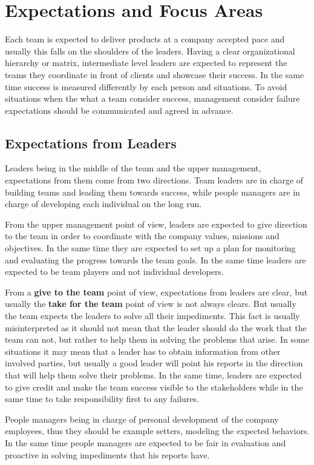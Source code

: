 \chapter{Expectations and Focus Areas}
\label{chapter:responsibilities}
Each team is expected to deliver products at a company accepted pace and usually this falls on the shoulders of the leaders. Having a clear organizational hierarchy or matrix, intermediate level leaders are expected to represent the teams they coordinate in front of clients and showcase their success. In the same time success is measured differently by each person and situations.  To avoid situations when the what a team consider success, management consider failure expectations should be communicated and agreed in advance.
\section{Expectations from Leaders}
\label{sec:fromleads}
Leaders being in the middle of the team and the upper management, expectations from them come from two directions. 
Team leaders are in charge of building teams and leading them towards success, while people managers are in charge of developing each individual on the long run. 

From the upper management point of view, leaders are expected to give direction to the team in order to coordinate with the company values, missions and objectives. In the same time they are expected to set up a plan for monitoring and evaluating the progress towards the team goals. In the same time leaders are expected to be team players and not individual developers.

From a \textbf{give to the team} point of view, expectations from leaders are clear, but usually the \textbf{take for the team} point of view is not always clears.  But usually the team expects the leaders to solve all their impediments. This fact is usually misinterpreted as it should not mean that the leader should do the work that the team can not, but rather to help them in solving the problems that arise. In some situations it may mean that a leader has to obtain information from other involved parties, but usually a good leader will point his reports in the direction that will help them solve their problems. In the same time, leaders are expected to give credit and make the team success visible to the stakeholders while in the same time to take responsibility first to any failures.

People managers being in charge of personal development of the company employees, thus they should be example setters, modeling the expected behaviors. In the same time people managers are expected to be fair in evaluation and proactive in solving impediments that his reports have.

